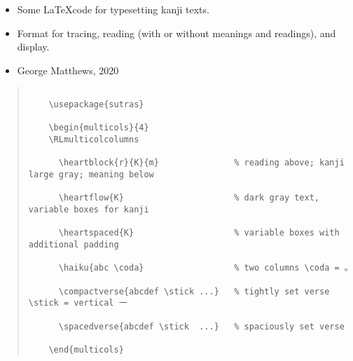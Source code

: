 \documentclass[letterpaper]{article}
\begin{document}
	\vspace*{3cm}
	


	

	\vspace*{2cm}
	    
	    \begin{itemize}
	    	\item[]  Some \LaTeX code for typesetting kanji texts.
	    	\item[] Format for tracing, reading (with or without meanings and readings), and display.
	    	\item[] \cc George Matthews, 2020
	    \end{itemize}
	    
	    
	    
	
	\vspace*{1cm}
	
	\begin{quotation}
		
	\begin{verbatim}
	
	\usepackage{sutras}
	
	\begin{multicols}{4}
	\RLmulticolcolumns
	
	  \heartblock{r}{K}{m}               % reading above; kanji large gray; meaning below
	
	  \heartflow{K}                      % dark gray text, variable boxes for kanji
	
	  \heartspaced{K}                    % variable boxes with additional padding
	
	  \haiku{abc \coda}                  % two columns \coda = 。
	
	  \compactverse{abcdef \stick ...}   % tightly set verse \stick = vertical 一
	
	  \spacedverse{abcdef \stick  ...}   % spaciously set verse
	
	\end{multicols}
	\end{verbatim}
	
\end{quotation}
	
	\vspace*{1cm}
 
\end{document}
